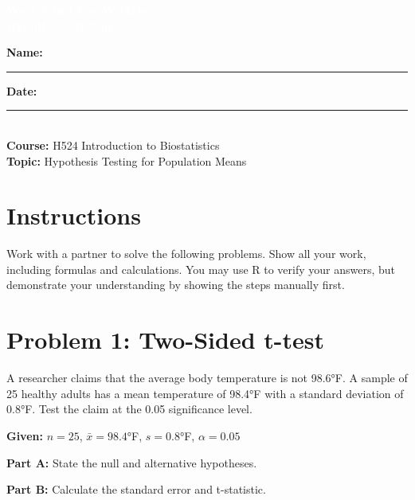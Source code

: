\documentclass[11pt]{article}
\title{}
\author{}
\date{}
\begin{document}
\begin{tcolorbox}[colback=osaorange,colframe=black,boxrule=2pt,arc=0pt,left=6pt,right=6pt,top=10pt,bottom=10pt]
\centering
\textcolor{white}{\textbf{\Large Week 5 In-Class Worksheet}}\\
\textcolor{white}{\textbf{\large Hypothesis Testing}}
\end{tcolorbox}

\vspace{8pt}

\noindent\textbf{Name:} \rule{8cm}{0.4pt} \hfill \textbf{Date:} \rule{4cm}{0.4pt}\\[0.5ex]
\textbf{Course:} H524 Introduction to Biostatistics\\
\textbf{Topic:} Hypothesis Testing for Population Means

\vspace{8pt}

\section*{Instructions}
Work with a partner to solve the following problems. Show all your work, including formulas and calculations. You may use R to verify your answers, but demonstrate your understanding by showing the steps manually first.

\vspace{12pt}

\section{Problem 1: Two-Sided t-test}

A researcher claims that the average body temperature is not 98.6°F. A sample of 25 healthy adults has a mean temperature of 98.4°F with a standard deviation of 0.8°F. Test the claim at the 0.05 significance level.

\textbf{Given:} $n = 25$, $\bar{x} = 98.4$°F, $s = 0.8$°F, $\alpha = 0.05$

\vspace{6pt}

\textbf{Part A:} State the null and alternative hypotheses.

\vspace{3cm}

\textbf{Part B:} Calculate the standard error and t-statistic.

\vspace{0.3cm}
\end{document}
